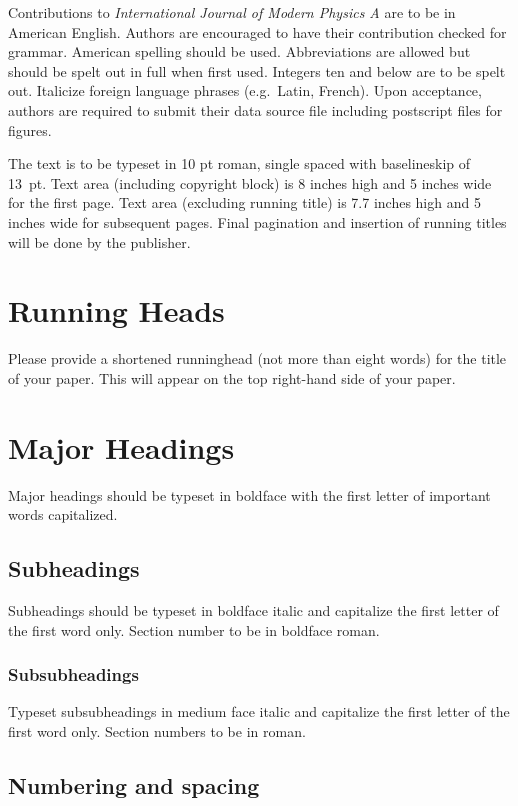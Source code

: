 \documentclass{ws-ijmpa}
\begin{document}
Contributions to {\it International Journal of Modern Physics A}
are to be in American English. Authors are encouraged to have their
contribution checked for grammar. American spelling should be
used. Abbreviations are allowed but should be spelt out in full when
first used. Integers ten and below are to be spelt out.  Italicize
foreign language phrases (e.g.~Latin, French).  Upon acceptance,
authors are required to submit their data source file including
postscript files for figures.

The text is to be typeset in 10 pt roman, single spaced with
baselineskip of 13~pt. Text area (including copyright block)
is 8 inches high and 5 inches wide for the first page.  Text area
(excluding running title) is 7.7 inches high and 5 inches wide for
subsequent pages.  Final pagination and insertion of running titles
will be done by the publisher.

\section{Running Heads}

Please provide a shortened runninghead (not more than eight words) for
the title of your paper. This will appear on the top right-hand side
of your paper.

\section{Major Headings}

Major headings should be typeset in boldface with the first
letter of important words capitalized.

\subsection{Subheadings}

Subheadings should be typeset in boldface italic and capitalize
the first letter of the first word only. Section number to be in
boldface roman.

\subsubsection{Subsubheadings}

Typeset subsubheadings in medium face italic and capitalize the
first letter of the first word only. Section numbers to be in
roman.

\subsection{Numbering and spacing}
\end{document}
